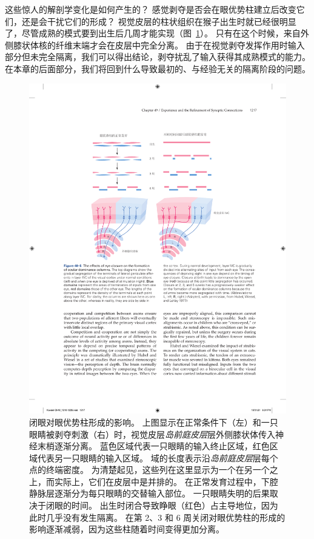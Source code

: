 这些惊人的解剖学变化是如何产生的？
感觉剥夺是否会在眼优势柱建立后改变它们，还是会干扰它们的形成？
视觉皮层的柱状组织在猴子出生时就已经很明显了，尽管成熟的模式要到出生后几周才能实现（图~\ref{fig:49_5}）。
只有在这个时候，来自外侧膝状体核的纤维末端才会在皮层中完全分离。
由于在视觉剥夺发挥作用时输入部分但未完全隔离，我们可以得出结论，剥夺扰乱了输入获得其成熟模式的能力。
在本章的后面部分，我们将回到什么导致最初的、与经验无关的隔离阶段的问题。


\begin{figure}[htbp]
	\centering
	\includegraphics[width=0.98\linewidth]{chap49/fig_49_5}
	\caption{闭眼对眼优势柱形成的影响。
		上图显示在正常条件下（左）和一只眼睛被剥夺刺激（右）时，视觉皮层\textit{岛前庭皮层}层外侧膝状体传入神经末梢逐渐分离。
		蓝色区域代表一只眼睛的输入终止区域，红色区域代表另一只眼睛的输入区域。
		域的长度表示沿\textit{岛前庭皮层}层每个点的终端密度。
		为清楚起见，这些列在这里显示为一个在另一个之上，而实际上，它们在皮层中是并排的。
		在正常发育过程中，下腔静脉层逐渐分为每只眼睛的交替输入部位。
		一只眼睛失明的后果取决于闭眼的时间。
		出生时闭合导致睁眼（红色）占主导地位，因为此时几乎没有发生隔离。
		在第 2、3 和 6 周关闭对眼优势柱的形成的影响逐渐减弱，因为这些柱随着时间变得更加分离\cite{hubel1977ferrier}。 }
	\label{fig:49_5}
\end{figure}



